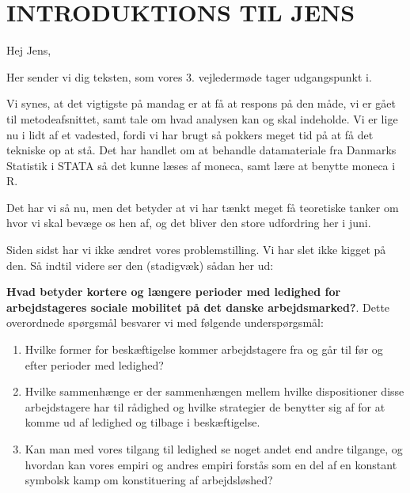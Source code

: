 
\chapter{INTRODUKTIONS TIL JENS} \label{intro}



Hej Jens,

Her sender vi dig teksten, som vores 3. vejledermøde tager udgangspunkt i.

Vi synes, at det vigtigste på mandag er at få at respons på den måde, vi er gået til metodeafsnittet, samt tale om hvad analysen kan og skal indeholde. Vi er lige nu i lidt af et vadested, fordi vi har brugt så pokkers meget tid på at få det tekniske op at stå. Det har handlet om at behandle datamateriale fra Danmarks Statistik i STATA så det kunne læses af moneca, samt lære at benytte moneca i R.

Det har vi så nu, men det betyder at vi har tænkt meget få teoretiske tanker om hvor vi skal bevæge os hen af, og det bliver den store udfordring her i juni. 

Siden sidst har vi ikke ændret vores problemstilling. Vi har slet ikke kigget på den. Så indtil videre ser den (stadigvæk) sådan her ud:

\textbf{Hvad betyder kortere og længere perioder med ledighed for arbejdstageres sociale mobilitet på det danske arbejdsmarked?}. Dette overordnede spørgsmål besvarer vi med følgende underspørgsmål:
 \begin{enumerate} [topsep=6pt,itemsep=-1ex]
   \item Hvilke former for beskæftigelse kommer arbejdstagere fra og går til før og efter perioder med ledighed?
   \item Hvilke sammenhænge er der sammenhængen mellem hvilke dispositioner disse arbejdstagere har til rådighed og hvilke strategier de benytter sig af for at komme ud af ledighed og tilbage i beskæftigelse.
   \item Kan man med vores tilgang til ledighed se noget andet end andre tilgange, og hvordan kan vores empiri og andres empiri forstås som en del af en konstant symbolsk kamp om konstituering af arbejdsløshed?
 \end{enumerate}

